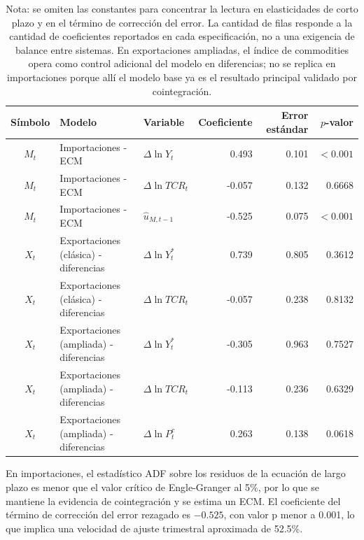 \documentclass[11pt,a4paper]{article}
\begin{document}
	\begin{table}[H]
		\centering
		\caption{Coeficientes de corto plazo: ECM y primeras diferencias.}
		\label{tab:coeficientes-corto-plazo}
		\scriptsize
		\begin{tabular}{cllrrr}
			\toprule
			Símbolo & Modelo & Variable & Coeficiente & Error estándar & \(p\)-valor \\
			\midrule
			\(M_t\) & Importaciones - ECM & \(\Delta \ln Y_t\) & 0.493 & 0.101 & \(<0.001\) \\
			\(M_t\) & Importaciones - ECM & \(\Delta \ln TCR_t\) & -0.057 & 0.132 & 0.6668 \\
			\(M_t\) & Importaciones - ECM & \(\hat{u}_{M,t-1}\) & -0.525 & 0.075 & \(<0.001\) \\
			\addlinespace
			\(X_t\) & Exportaciones (clásica) - diferencias & \(\Delta \ln Y_t^*\) & 0.739 & 0.805 & 0.3612 \\
			\(X_t\) & Exportaciones (clásica) - diferencias & \(\Delta \ln TCR_t\) & -0.057 & 0.238 & 0.8132 \\
			\addlinespace
			\(X_t\) & Exportaciones (ampliada) - diferencias & \(\Delta \ln Y_t^*\) & -0.305 & 0.963 & 0.7527 \\
			\(X_t\) & Exportaciones (ampliada) - diferencias & \(\Delta \ln TCR_t\) & -0.113 & 0.236 & 0.6329 \\
			\(X_t\) & Exportaciones (ampliada) - diferencias & \(\Delta \ln P_t^c\) & 0.263 & 0.138 & 0.0618 \\
			\bottomrule
		\end{tabular}
		\caption*{\footnotesize Nota: se omiten las constantes para concentrar la
			lectura en elasticidades de corto plazo y en el término de corrección del error.
			La cantidad de filas responde a la cantidad de coeficientes reportados en cada
			especificación, no a una exigencia de balance entre sistemas. En exportaciones
			ampliadas, el índice de commodities opera como control adicional del modelo en
			diferencias; no se replica en importaciones porque allí el modelo base ya es
			el resultado principal validado por cointegración.}
	\end{table}
	
	En importaciones, el estadístico ADF sobre los residuos de la ecuación de largo
	plazo es menor que el valor crítico de Engle-Granger al 5\%, por lo que se
	mantiene la evidencia de cointegración y se estima un ECM. El coeficiente del
	término de corrección del error rezagado es \(-0.525\), con valor p menor a
	0.001, lo que implica una velocidad de ajuste trimestral aproximada de 52.5\%.
	
\end{document}
